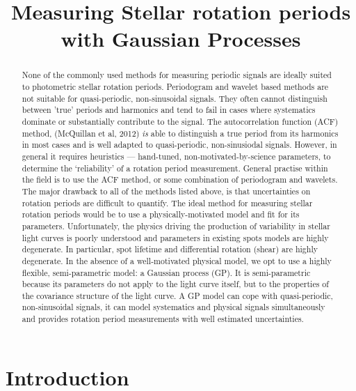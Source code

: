 \documentclass[12pt,preprint]{aastex}
\begin{document}
\title{Measuring Stellar rotation periods with Gaussian Processes}

\begin{abstract}

None of the commonly used methods for measuring periodic signals are ideally suited to photometric stellar rotation periods.
Periodogram and wavelet based methods are not suitable for quasi-periodic, non-sinusoidal signals.
They often cannot distinguish between 'true' periods and harmonics and tend to fail in cases where systematics dominate or substantially contribute to the signal.
The autocorrelation function (ACF) method, (McQuillan et al, 2012) \emph{is} able to distinguish a true period from its harmonics in most cases and is well adapted to quasi-periodic, non-sinusiodal signals.
However, in general it requires heuristics --- hand-tuned, non-motivated-by-science parameters, to determine the `reliability' of a rotation period measurement.
General practise within the field is to use the ACF method, or some combination of periodogram and wavelets. %
The major drawback to all of the methods listed above, is that uncertainties on rotation periods are difficult to quantify.
The ideal method for measuring stellar rotation periods would be to use a physically-motivated model and fit for its parameters.
Unfortunately, the physics driving the production of variability in stellar light curves is poorly understood and parameters in existing spots models are highly degenerate.
In particular, spot lifetime and differential rotation (shear) are highly degenerate.
In the absence of a well-motivated physical model, we opt to use a highly flexible, semi-parametric model: a Gaussian process (GP).
It is semi-parametric because its parameters do not apply to the light curve itself, but to the properties of the covariance structure of the light curve.
A GP model can cope with quasi-periodic, non-sinusoidal signals, it can model systematics and physical signals simultaneously and provides rotation period measurements with well estimated uncertainties.

\end{abstract}

\section{Introduction}
\end{document}
